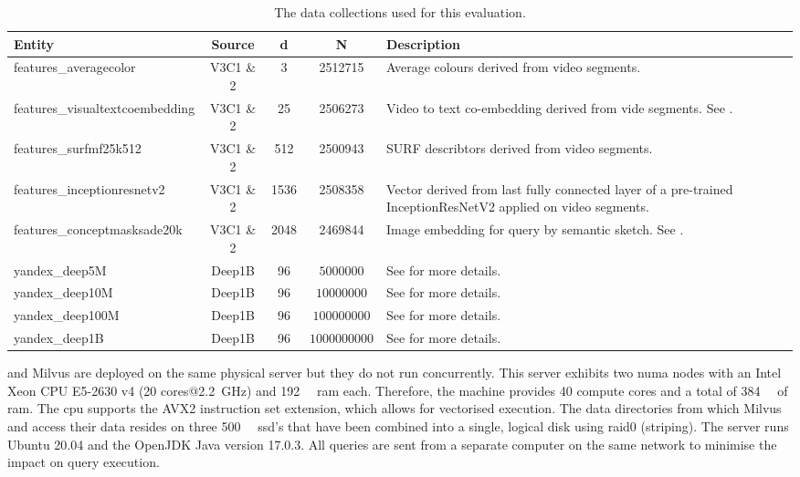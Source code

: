 \begin{table}
    \begin{tabular}{ | l | c | c | c | p{5cm} |}
        \hline
        \textbf{Entity} & \textbf{Source} & \textbf{d} & \textbf{N} & \textbf{Description} \\
        \hline
        \hline
        features\_averagecolor & V3C1 \& 2  & 3 & 2512715 & Average colours derived from video segments. \\ 
        \hline
        features\_visualtextcoembedding & V3C1 \& 2 & 25 & 2506273 & Video to text co-embedding derived from vide segments. See \cite{Spiess:2021Competitive}. \\
        \hline
        features\_surfmf25k512  & V3C1 \& 2  & 512 & 2500943 & SURF \cite{Bay:2006surf} describtors derived from video segments. \\
        \hline
        features\_inceptionresnetv2 & V3C1 \& 2  & 1536 & 2508358 & Vector derived from last fully connected layer of a pre-trained InceptionResNetV2 applied on video segments.\\
        \hline
        features\_conceptmasksade20k & V3C1 \& 2 & 2048 & 2469844 & Image embedding for query by semantic sketch. See \cite{Rossetto:2019Query}. \\
        \hline
        yandex\_deep5M  & Deep1B  & 96 & $5000000$ & See \cite{Babenko:2016Efficient} for more details. \\
        \hline
        yandex\_deep10M  & Deep1B & 96 & $10000000$ & See \cite{Babenko:2016Efficient} for more details. \\
        \hline
        yandex\_deep100M  & Deep1B & 96 & $100000000$ & See \cite{Babenko:2016Efficient} for more details. \\
        \hline
        yandex\_deep1B  & Deep1B & 96 & $1000000000$ & See \cite{Babenko:2016Efficient} for more details. \\
        \hline
        \hline
    \end{tabular}
    \caption{The data collections used for this evaluation. }
    \label{table:datasets}
\end{table}

\cottontail{} and Milvus are deployed on the same physical server but they do not run concurrently. This server exhibits two \acrshort{numa} nodes with an Intel Xeon CPU E5-2630 v4 (20 cores@\SI{2.2}{\giga\hertz}) and \SI{192}{\giga\byte} \acrshort{ram} each. Therefore, the machine provides 40 compute cores and a total of \SI{384}{\giga\byte} of \acrshort{ram}. The \acrshort{cpu} supports the AVX2 instruction set extension, which allows for vectorised execution. The data directories from which Milvus and \cottontail{} access their data resides on three \SI{500}{\giga\byte} \acrshort{ssd}'s that have been combined into a single, logical disk using \acrshort{raid}0 (striping). The server runs Ubuntu 20.04 and the OpenJDK Java version 17.0.3. All queries are sent from a separate computer on the same network to minimise the impact on query execution.



